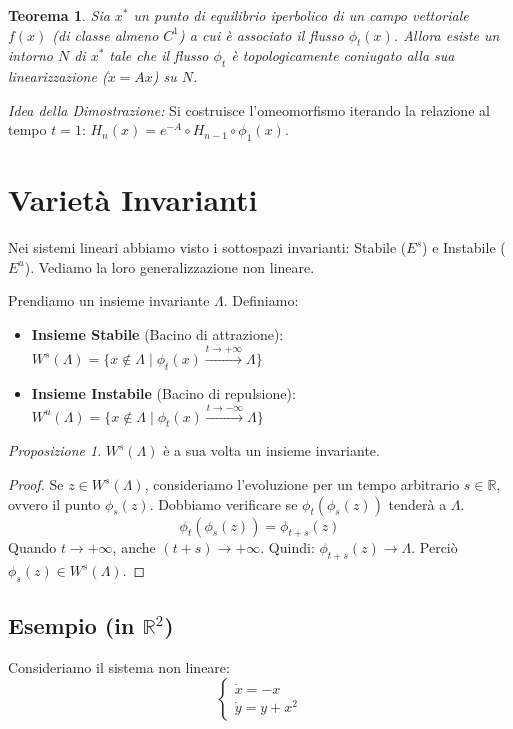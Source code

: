 \documentclass[openany]{book}
\newtheorem*{teorema}{Teorema}
\theoremstyle{definition}
\theoremstyle{remark}
\newtheorem{proposizione}{Proposizione}
\newcommand{\R}{\mathbb{R}}
\begin{document}
\begin{teorema}
Sia $x^*$ un punto di equilibrio iperbolico di un campo vettoriale $f(x)$ (di classe almeno $C^1$) a cui è associato il flusso $\phi_t(x)$. Allora esiste un intorno $N$ di $x^*$ tale che il flusso $\phi_t$ è topologicamente coniugato alla sua linearizzazione ($\dot{x} = Ax$) su $N$.
\end{teorema}

\noindent\textit{Idea della Dimostrazione:} Si costruisce l'omeomorfismo iterando la relazione al tempo $t=1$: $H_n(x) = e^{-A} \circ H_{n-1} \circ \phi_1(x)$.

\section{Varietà Invarianti}
Nei sistemi lineari abbiamo visto i sottospazi invarianti: Stabile ($E^s$) e Instabile ($E^u$). Vediamo la loro generalizzazione non lineare.

Prendiamo un insieme invariante $\Lambda$. Definiamo:
\begin{itemize}
    \item \textbf{Insieme Stabile} (Bacino di attrazione): $W^s(\Lambda) = \{ x \notin \Lambda \mid \phi_t(x) \xrightarrow{t \to +\infty} \Lambda \}$
    \item \textbf{Insieme Instabile} (Bacino di repulsione): $W^u(\Lambda) = \{ x \notin \Lambda \mid \phi_t(x) \xrightarrow{t \to -\infty} \Lambda \}$
\end{itemize}

\begin{proposizione}
$W^s(\Lambda)$ è a sua volta un insieme invariante.
\end{proposizione}

\begin{proof}
Se $z \in W^s(\Lambda)$, consideriamo l'evoluzione per un tempo arbitrario $s \in \R$, ovvero il punto $\phi_s(z)$. Dobbiamo verificare se $\phi_t( \phi_s(z) )$ tenderà a $\Lambda$.
\[
\phi_t(\phi_s(z)) = \phi_{t+s}(z)
\]
Quando $t \to +\infty$, anche $(t+s) \to +\infty$. Quindi: $\phi_{t+s}(z) \to \Lambda$. Perciò $\phi_s(z) \in W^s(\Lambda)$.
\end{proof}

\subsection*{Esempio (in $\R^2$)}

Consideriamo il sistema non lineare:
\[
\begin{cases}
\dot{x} = -x \\
\dot{y} = y + x^2
\end{cases}
\]
\end{document}
